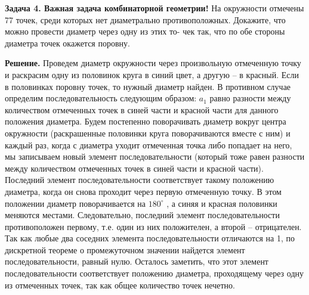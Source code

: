 \newpage

\hspace{3mm}

\textbf{Задача 4. Важная задача комбинаторной геометрии!} На окружности отмечены 77 точек, среди которых нет диаметрально противоположных. Докажите, что можно провести диаметр через одну из этих то- чек так, что по обе стороны диаметра точек окажется поровну.

\textbf{Решение.} Проведем диаметр окружности через произвольную отмеченную точку и раскрасим одну из половинок круга в синий цвет, а другую – в красный. Если в половинках поровну точек, то нужный диаметр найден. В противном случае определим последовательность следующим образом: $a_1$ равно разности между количеством отмеченных точек в синей части и красной части для данного положения диаметра. Будем постепенно поворачивать диаметр вокруг центра окружности (раскрашенные половинки круга поворачиваются вместе с ним) и каждый раз, когда с диаметра уходит отмеченная точка либо попадает на него, мы записываем новый элемент последовательности (который тоже равен разности между количеством отмеченных точек в синей части и красной части). Последний элемент последовательности соответствует такому положению диаметра, когда он снова проходит через первую отмеченную точку. В этом положении диаметр поворачивается на $180^{\circ}$ , а синяя и красная половинки меняются местами. Следовательно, последний элемент последовательности противоположен первому, т.е. один из них положителен, а второй – отрицателен. Так как любые два соседних элемента последовательности отличаются на 1, по дискретной теореме о промежуточном значении найдется элемент последовательности, равный нулю. Осталось заметить, что этот элемент последовательности соответствует положению диаметра, проходящему через одну из отмеченных точек, так как общее количество точек нечетно.